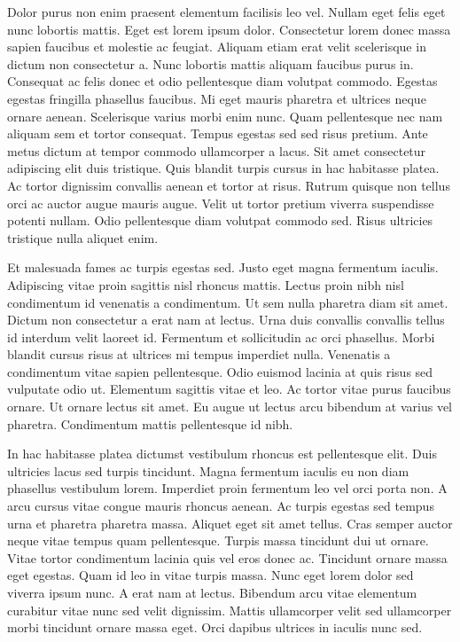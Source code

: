 \documentclass[11pt,a4paper]{article}
\begin{document}
Dolor purus non enim praesent elementum facilisis leo vel. Nullam eget felis eget nunc lobortis mattis. Eget est lorem ipsum dolor. Consectetur lorem donec massa sapien faucibus et molestie ac feugiat. Aliquam etiam erat velit scelerisque in dictum non consectetur a. Nunc lobortis mattis aliquam faucibus purus in. Consequat ac felis donec et odio pellentesque diam volutpat commodo. Egestas egestas fringilla phasellus faucibus. Mi eget mauris pharetra et ultrices neque ornare aenean. Scelerisque varius morbi enim nunc. Quam pellentesque nec nam aliquam sem et tortor consequat. Tempus egestas sed sed risus pretium. Ante metus dictum at tempor commodo ullamcorper a lacus. Sit amet consectetur adipiscing elit duis tristique. Quis blandit turpis cursus in hac habitasse platea. Ac tortor dignissim convallis aenean et tortor at risus. Rutrum quisque non tellus orci ac auctor augue mauris augue. Velit ut tortor pretium viverra suspendisse potenti nullam. Odio pellentesque diam volutpat commodo sed. Risus ultricies tristique nulla aliquet enim.

Et malesuada fames ac turpis egestas sed. Justo eget magna fermentum iaculis. Adipiscing vitae proin sagittis nisl rhoncus mattis. Lectus proin nibh nisl condimentum id venenatis a condimentum. Ut sem nulla pharetra diam sit amet. Dictum non consectetur a erat nam at lectus. Urna duis convallis convallis tellus id interdum velit laoreet id. Fermentum et sollicitudin ac orci phasellus. Morbi blandit cursus risus at ultrices mi tempus imperdiet nulla. Venenatis a condimentum vitae sapien pellentesque. Odio euismod lacinia at quis risus sed vulputate odio ut. Elementum sagittis vitae et leo. Ac tortor vitae purus faucibus ornare. Ut ornare lectus sit amet. Eu augue ut lectus arcu bibendum at varius vel pharetra. Condimentum mattis pellentesque id nibh.

In hac habitasse platea dictumst vestibulum rhoncus est pellentesque elit. Duis ultricies lacus sed turpis tincidunt. Magna fermentum iaculis eu non diam phasellus vestibulum lorem. Imperdiet proin fermentum leo vel orci porta non. A arcu cursus vitae congue mauris rhoncus aenean. Ac turpis egestas sed tempus urna et pharetra pharetra massa. Aliquet eget sit amet tellus. Cras semper auctor neque vitae tempus quam pellentesque. Turpis massa tincidunt dui ut ornare. Vitae tortor condimentum lacinia quis vel eros donec ac. Tincidunt ornare massa eget egestas. Quam id leo in vitae turpis massa. Nunc eget lorem dolor sed viverra ipsum nunc. A erat nam at lectus. Bibendum arcu vitae elementum curabitur vitae nunc sed velit dignissim. Mattis ullamcorper velit sed ullamcorper morbi tincidunt ornare massa eget. Orci dapibus ultrices in iaculis nunc sed.
\end{document}
